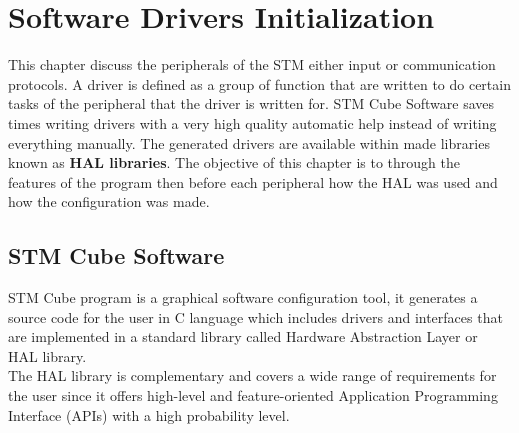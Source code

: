 \chapter{Software Drivers Initialization}

This chapter discuss the peripherals of the STM either input or communication protocols. A driver is defined as a group of function that are written to do certain tasks of the peripheral that the driver is written for.
STM Cube Software saves times writing drivers with a very high quality automatic help instead of writing everything manually. The generated drivers are available within made libraries known as \textbf{HAL libraries}.
The objective of this chapter is to through the features of the program then before each peripheral how the HAL was used and how the configuration was made.

\section{STM Cube Software}

STM Cube program is a graphical software configuration tool, it generates a source code for the user in C language which includes drivers and interfaces that are implemented in a standard library called Hardware Abstraction Layer or HAL library.\\ The HAL library is complementary and covers a wide range of requirements for the user since it offers high-level and feature-oriented Application Programming Interface (APIs) with a high probability level.\\

